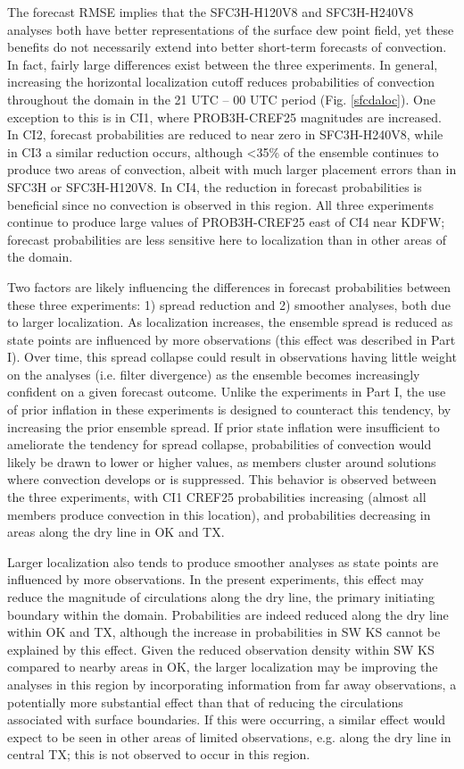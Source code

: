 The forecast RMSE implies that the SFC3H-H120V8 and SFC3H-H240V8 analyses both have better representations of the surface dew point field, yet these benefits do not necessarily extend into better short-term forecasts of convection. In fact, fairly large differences exist between the three experiments. In general, increasing the horizontal localization cutoff reduces probabilities of convection throughout the domain in the 21 UTC -- 00 UTC period (Fig. \ref{sfcdaloc}). One exception to this is in CI1, where PROB3H-CREF25 magnitudes are increased. In CI2, forecast probabilities are reduced to near zero in SFC3H-H240V8, while in CI3 a similar reduction occurs, although \textless 35\% of the ensemble continues to produce two areas of convection, albeit with much larger placement errors than in SFC3H or SFC3H-H120V8. In CI4, the reduction in forecast probabilities is beneficial since no convection is observed in this region. All three experiments continue to produce large values of PROB3H-CREF25 east of CI4 near KDFW; forecast probabilities are less sensitive here to localization than in other areas of the domain.

Two factors are likely influencing the differences in forecast probabilities between these three experiments: 1) spread reduction and 2) smoother analyses, both due to larger localization. As localization increases, the ensemble spread is reduced as state points are influenced by more observations (this effect was described in Part I). Over time, this spread collapse could result in observations having little weight on the analyses (i.e. filter divergence) as the ensemble becomes increasingly confident on a given forecast outcome. Unlike the experiments in Part I, the use of prior inflation in these experiments is designed to counteract this tendency, by increasing the prior ensemble spread. If prior state inflation were insufficient to ameliorate the tendency for spread collapse, probabilities of convection would likely be drawn to lower or higher values, as members cluster around solutions where convection develops or is suppressed. This behavior is observed between the three experiments, with CI1 CREF25 probabilities increasing (almost all members produce convection in this location), and probabilities decreasing in areas along the dry line in OK and TX.

Larger localization also tends to produce smoother analyses as state points are influenced by more observations. In the present experiments, this effect may reduce the magnitude of circulations along the dry line, the primary initiating boundary within the domain. Probabilities are indeed reduced along the dry line within OK and TX, although the increase in probabilities in SW KS cannot be explained by this effect. Given the reduced observation density within SW KS compared to nearby areas in OK, the larger localization may be improving the analyses in this region by incorporating information from far away observations, a potentially more substantial effect than that of reducing the circulations associated with surface boundaries. If this were occurring, a similar effect would expect to be seen in other areas of limited observations, e.g. along the dry line in central TX; this is not observed to occur in this region.

